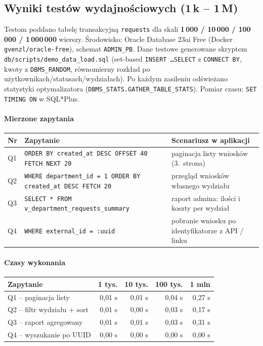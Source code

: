 \documentclass[12pt,a4paper]{article}
\begin{document}
\subsection{Wyniki testów wydajnościowych (1\,k -- 1\,M)}
Testom poddano tabelę transakcyjną \texttt{requests} dla skali
\textbf{1\,000 / 10\,000 / 100\,000 / 1\,000\,000} wierszy.
Środowisko: Oracle Database 23ai Free (Docker \texttt{gvenzl/oracle-free}),
schemat \texttt{ADMIN\_PB}. Dane testowe generowane skryptem
\texttt{db/scripts/demo\_data\_load.sql} (set-based \texttt{INSERT \ldots SELECT}
z \texttt{CONNECT BY}, kwoty z \texttt{DBMS\_RANDOM}, równomierny rozkład po
użytkownikach/statusach/wydziałach). Po każdym zasileniu odświeżano statystyki
optymalizatora (\texttt{DBMS\_STATS.GATHER\_TABLE\_STATS}). Pomiar czasu:
\texttt{SET TIMING ON} w SQL*Plus.

\paragraph{Mierzone zapytania}
\begin{center}
\begin{tabularx}{\textwidth}{l X X}
  \toprule
  \textbf{Nr} & \textbf{Zapytanie} & \textbf{Scenariusz w aplikacji} \\
  \midrule
  Q1 & \texttt{ORDER BY created\_at DESC OFFSET 40 FETCH NEXT 20}
     & paginacja listy wniosków (3.\ strona) \\
  Q2 & \texttt{WHERE department\_id = 1 ORDER BY created\_at DESC FETCH 20}
     & przegląd wniosków własnego wydziału \\
  Q3 & \texttt{SELECT * FROM v\_department\_requests\_summary}
     & raport admina: ilości i koszty per wydział \\
  Q4 & \texttt{WHERE external\_id = :uuid}
     & pobranie wniosku po identyfikatorze z API / linku \\
  \bottomrule
\end{tabularx}
\end{center}

\paragraph{Czasy wykonania}
\begin{center}
\begin{tabular}{l r r r r}
  \toprule
  \textbf{Zapytanie} & \textbf{1 tys.} & \textbf{10 tys.} & \textbf{100 tys.} & \textbf{1 mln} \\
  \midrule
  Q1 -- paginacja listy        & 0{,}01 s & 0{,}01 s & 0{,}04 s & 0{,}27 s \\
  Q2 -- filtr wydziału + sort  & 0{,}01 s & 0{,}00 s & 0{,}03 s & 0{,}17 s \\
  Q3 -- raport agregowany      & 0{,}01 s & 0{,}01 s & 0{,}03 s & 0{,}31 s \\
  Q4 -- wyszukanie po UUID     & 0{,}00 s & 0{,}00 s & 0{,}00 s & 0{,}00 s \\
  \bottomrule
\end{tabular}
\end{center}
\end{document}
